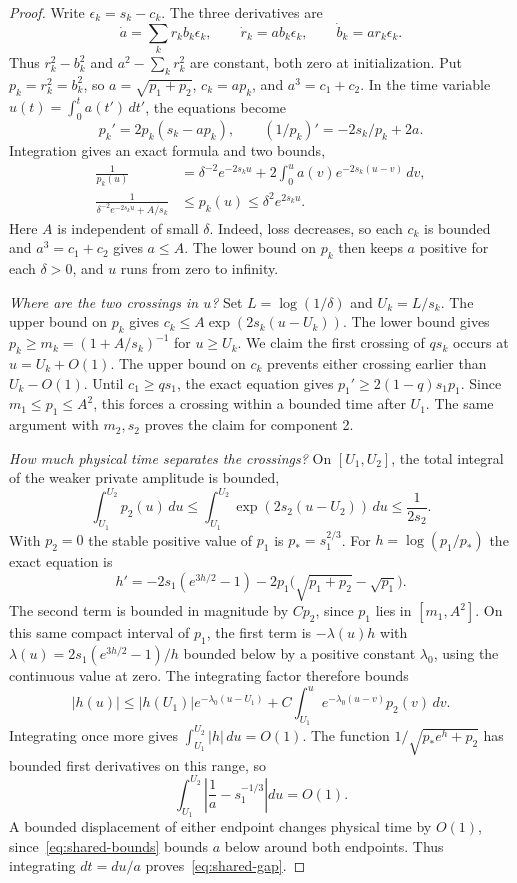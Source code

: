 \begin{proof}
Write \(\epsilon_k=s_k-c_k\). The three derivatives are
\[
 \dot a=\sum_k r_k b_k\epsilon_k,\qquad
 \dot r_k=a b_k\epsilon_k,\qquad \dot b_k=a r_k\epsilon_k .
\]
Thus \(r_k^2-b_k^2\) and \(a^2-\sum_k r_k^2\) are constant, both zero
at initialization. Put \(p_k=r_k^2=b_k^2\), so \(a=\sqrt{p_1+p_2}\),
\(c_k=ap_k\), and \(a^3=c_1+c_2\). In the time variable
\(u(t)=\int_0^t a(t')\,dt'\), the equations become
\[
 p_k'=2p_k(s_k-ap_k),\qquad
 (1/p_k)'=-2s_k/p_k+2a.
\]
Integration gives an exact formula and two bounds,
\begin{align}
 \frac{1}{p_k(u)} &=
 \delta^{-2}e^{-2s_k u}
 +2\int_0^u a(v)e^{-2s_k(u-v)}\,dv, \label{eq:shared-recip}\\
 \frac{1}{\delta^{-2}e^{-2s_ku}+A/s_k}
 &\le p_k(u)\le\delta^2 e^{2s_ku}. \label{eq:shared-bounds}
\end{align}
Here \(A\) is independent of small \(\delta\). Indeed, loss decreases, so
each \(c_k\) is bounded and \(a^3=c_1+c_2\) gives \(a\le A\). The lower
bound on \(p_k\) then keeps \(a\) positive for each \(\delta>0\), and
\(u\) runs from zero to infinity.

\emph{Where are the two crossings in \(u\)?}
Set \(L=\log(1/\delta)\) and \(U_k=L/s_k\).
The upper bound on \(p_k\) gives \(c_k\le A\exp(2s_k(u-U_k))\).
The lower bound gives \(p_k\ge m_k=(1+A/s_k)^{-1}\) for \(u\ge U_k\).
We claim the first crossing of \(q s_k\) occurs at \(u=U_k+O(1)\).
The upper bound on \(c_k\) prevents either crossing earlier than
\(U_k-O(1)\). Until \(c_1\ge q s_1\), the exact equation gives
\(p_1'\ge 2(1-q)s_1p_1\). Since \(m_1\le p_1\le A^2\), this
forces a crossing within a bounded time after \(U_1\). The same argument
with \(m_2,s_2\) proves the claim for component 2.

\emph{How much physical time separates the crossings?}
On \([U_1,U_2]\), the total integral of the weaker private amplitude is bounded,
\[
 \int_{U_1}^{U_2}p_2(u)\,du\le
 \int_{U_1}^{U_2}\exp(2s_2(u-U_2))\,du\le \frac{1}{2s_2}.
\]
With \(p_2=0\) the stable positive value of \(p_1\) is \(p_*=s_1^{2/3}\).
For \(h=\log(p_1/p_*)\) the exact equation is
\[
 h'=-2s_1(e^{3h/2}-1)
       -2p_1\bigl(\sqrt{p_1+p_2}-\sqrt{p_1}\bigr).
\]
The second term is bounded in magnitude by \(C p_2\), since \(p_1\) lies
in \([m_1,A^2]\). On this same compact interval of \(p_1\), the first term
is \(-\lambda(u)h\) with
\(\lambda(u)=2s_1(e^{3h/2}-1)/h\) bounded below by a positive constant
\(\lambda_0\), using the continuous value at zero. The integrating factor
therefore bounds
\[
 |h(u)|\le |h(U_1)|e^{-\lambda_0(u-U_1)}
       +C\int_{U_1}^{u}e^{-\lambda_0(u-v)}p_2(v)\,dv .
\]
Integrating once more gives \(\int_{U_1}^{U_2}|h|\,du=O(1)\).
The function \(1/\sqrt{p_*e^h+p_2}\) has bounded first derivatives on
this range, so
\[
 \int_{U_1}^{U_2}\left|\frac1a-s_1^{-1/3}\right|du=O(1).
\]
A bounded displacement of either endpoint changes physical time by \(O(1)\),
since~\eqref{eq:shared-bounds} bounds \(a\) below around both endpoints.
Thus integrating \(dt=du/a\) proves~\eqref{eq:shared-gap}.


\end{proof}
